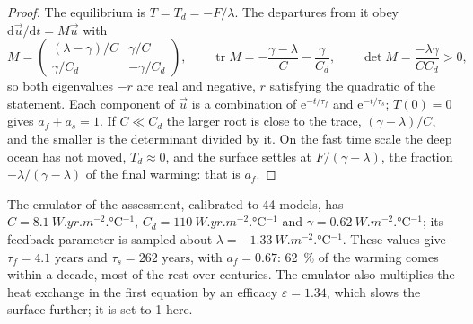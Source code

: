 \begin{proof}
The equilibrium is $T = T_d = -F/\lambda$. The departures from it obey
$\mathrm d\vec u/\mathrm dt = M\vec u$ with
\[
M = \begin{pmatrix} (\lambda - \gamma)/C & \gamma/C\\ \gamma/C_d &
-\gamma/C_d\end{pmatrix}, \qquad
\operatorname{tr}M = -\frac{\gamma - \lambda}{C} - \frac{\gamma}{C_d},
\qquad \det M = \frac{-\lambda\gamma}{CC_d} > 0 ,
\]
so both eigenvalues $-r$ are real and negative, $r$ satisfying the quadratic
of the statement. Each component of $\vec u$ is a combination of $\mathrm
e^{-t/\tau_f}$ and $\mathrm e^{-t/\tau_s}$; $T(0) = 0$ gives $a_f + a_s =
1$. If $C \ll C_d$ the larger root is close to the trace, $(\gamma -
\lambda)/C$, and the smaller is the determinant divided by it. On the fast
time scale the deep ocean has not moved, $T_d \approx 0$, and the surface
settles at $F/(\gamma - \lambda)$, the fraction $-\lambda/(\gamma - \lambda)$
of the final warming: that is $a_f$.
\end{proof}

The emulator of the assessment, calibrated to 44 models, has $C =
\qty{8.1}{W.yr.m^{-2}.\celsius^{-1}}$, $C_d = \qty{110}{W.yr.m^{-2}.\celsius^{-1}}$
and $\gamma = \qty{0.62}{W.m^{-2}.\celsius^{-1}}$; its feedback parameter is
sampled about $\lambda = \qty{-1.33}{W.m^{-2}.\celsius^{-1}}$. These values
give $\tau_f = \num{4.1}\text{ years}$ and $\tau_s = \num{262}\text{ years}$, with $a_f =
0.67$: \qty{62}{\percent} of the warming comes within a decade, most of the
rest over centuries. The emulator also multiplies the heat exchange in the first
equation by an efficacy $\varepsilon = 1.34$, which slows the surface
further; it is set to 1 here.

